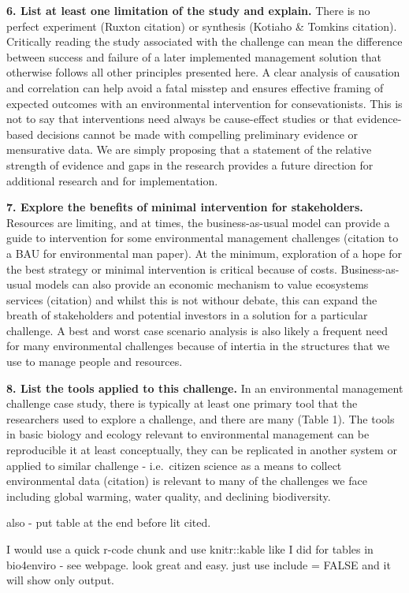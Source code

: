 \documentclass[10pt,letterpaper]{article}
\begin{document}
\textbf{6. List at least one limitation of the study and explain.} There
is no perfect experiment (Ruxton citation) or synthesis (Kotiaho \&
Tomkins citation). Critically reading the study associated with the
challenge can mean the difference between success and failure of a later
implemented management solution that otherwise follows all other
principles presented here. A clear analysis of causation and correlation
can help avoid a fatal misstep and ensures effective framing of expected
outcomes with an environmental intervention for consevationists. This is
not to say that interventions need always be cause-effect studies or
that evidence-based decisions cannot be made with compelling preliminary
evidence or mensurative data. We are simply proposing that a statement
of the relative strength of evidence and gaps in the research provides a
future direction for additional research and for implementation.

\textbf{7. Explore the benefits of minimal intervention for
stakeholders.} Resources are limiting, and at times, the
business-as-usual model can provide a guide to intervention for some
environmental management challenges (citation to a BAU for environmental
man paper). At the minimum, exploration of a hope for the best strategy
or minimal intervention is critical because of costs. Business-as-usual
models can also provide an economic mechanism to value ecosystems
services (citation) and whilst this is not withour debate, this can
expand the breath of stakeholders and potential investors in a solution
for a particular challenge. A best and worst case scenario analysis is
also likely a frequent need for many environmental challenges because of
intertia in the structures that we use to manage people and resources.

\textbf{8. List the tools applied to this challenge.} In an
environmental management challenge case study, there is typically at
least one primary tool that the researchers used to explore a challenge,
and there are many (Table 1). The tools in basic biology and ecology
relevant to environmental management can be reproducible it at least
conceptually, they can be replicated in another system or applied to
similar challenge - i.e.~citizen science as a means to collect
environmental data (citation) is relevant to many of the challenges we
face including global warming, water quality, and declining
biodiversity.

also - put table at the end before lit cited.

I would use a quick r-code chunk and use knitr::kable like I did for
tables in bio4enviro - see webpage. look great and easy. just use
include = FALSE and it will show only output.
\end{document}
